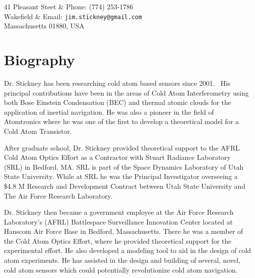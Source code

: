 \documentclass[overlapped,line,letterpaper]{res}
\begin{document}

\setlength{\leftmargini}{0em}
\renewcommand{\labelitemi}{}

\renewcommand{\namefont}{\large\textbf}



\begin{resume}

\begin{ncolumn}{2}

41 Pleasant Steet & Phone:  (774) 253-1786 \\
Wakefield               & Email: {\tt jim.stickney@gmail.com} \\
Massachusetts 01880, USA
\end{ncolumn}





\section{ \bf Biography }

Dr. Stickney has been researching cold atom based sensors since 2001.  His principal contributions have been in the areas of Cold Atom Interferometry using both Bose Einstein Condensation (BEC) and thermal atomic clouds for the application of inertial navigation. He was also a pioneer in the field of Atomtronics where he was one of the first to develop a theoretical model for a Cold Atom Transistor.  

After graduate school, Dr. Stickney provided theoretical support to the AFRL Cold Atom Optics Effort as a Contractor with Stuart Radiance Laboratory (SRL) in Bedford, MA. SRL is part of the Space Dynamics Laboratory of Utah State University. While at SRL he was the Principal Investigator overseeing a \$4.8 M Research and Development Contract between Utah State University and The Air Force Research Laboratory. 

Dr. Stickney then became a government employee at the Air Force Research Laboratory’s (AFRL) Battlespace Surveillance Innovation Center located at Hanscom Air Force Base in Bedford, Massachusetts. There he was a member of the Cold Atom Optics Effort, where he provided theoretical support for the experimental effort. He also developed a modeling tool to aid in the design of cold atom experiments. He has assisted in the design and building of several, novel, cold atom sensors which could potentially revolutionize cold atom navigation. 


\end{resume}
\end{document}
